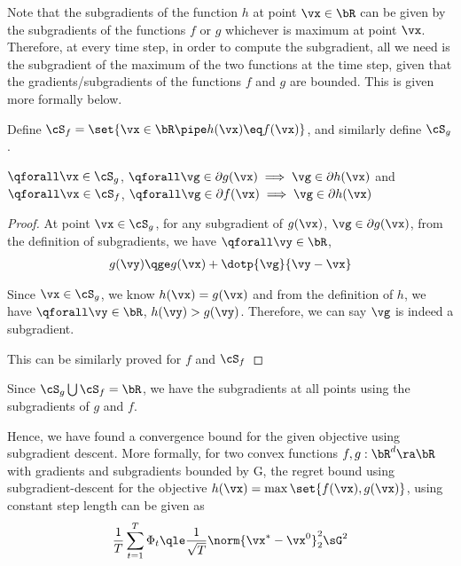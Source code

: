 \documentclass{article}
\newcommand{\x}[1]{\vx^{#1}}
\newcommand{\xs}{\vx^{\ast}}
\begin{document}
\begin{question}
	Note that the subgradients of the function $h$ at point $\vx \in \bR$ can be given by the subgradients of the functions $f$ or $g$ whichever is maximum at point $\vx$. Therefore, at every time step, in order to compute the subgradient, all we need is the subgradient of the maximum of the two functions at the time step, given that the gradients/subgradients of the functions $f$ and $g$ are bounded. This is given more formally below.

	Define $\cS_f = \set{\vx \in \bR \pipe h(\vx) \eq f(\vx)}$, and similarly define $\cS_g$.

	\begin{claim}
		$\qforall \vx \in \cS_g$, $\qforall \vg \in \partial g(\vx) \implies \vg \in \partial h(\vx)$ and $\qforall \vx \in \cS_f$, $\qforall \vg \in \partial f(\vx) \implies \vg \in \partial h(\vx)$

		\begin{proof}
			At point $\vx \in \cS_g$, for any subgradient of $g(\vx)$, $\vg \in \partial g(\vx)$, from the definition of subgradients, we have $\qforall \vy \in \bR$,
			\begin{align*}
				g(\vy) \qge g(\vx) + \dotp{\vg}{\vy - \vx}
			\end{align*}

			Since $\vx \in \cS_g$, we know $h(\vx) = g(\vx)$ and from the definition of $h$, we have $\qforall \vy \in \bR$, $h(\vy) > g(\vy)$. Therefore, we can say $\vg$ is indeed a subgradient.

			This can be similarly proved for $f$ and $\cS_f$
		\end{proof}
	\end{claim}

	Since $\cS_g \bigcup \cS_f = \bR$, we have the subgradients at all points using the subgradients of $g$ and $f$.

	Hence, we have found a convergence bound for the given objective using subgradient descent. More formally, for two convex functions $f, g : \bR^d \ra \bR$ with gradients and subgradients bounded by G, the regret bound using subgradient-descent for the objective $h(\vx) = \max \set{f(\vx), g(\vx)}$, using constant step length can be given as
	\begin{align}
		\frac{1}{T} \sum_{t = 1}^T \Phi_t	\qle	\frac{1}{\sqrt{T}} \norm{\xs - \x{0}}_2^2 \sG^2
	\end{align}
\end{question}
\end{document}
